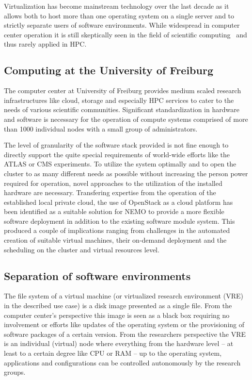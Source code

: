 Virtualization has become mainstream technology over the last decade as it allows
both to host more than one operating system on a single server and to strictly
separate users of software environments. While widespread in computer center
operation it is still skeptically seen in the field of scientific computing~\cite{VirtualisationScientificComp} and
thus rarely applied in HPC.

\subsection{Computing at the University of Freiburg}

The computer center at University of Freiburg provides
medium scaled research
infrastructures like cloud, storage and especially HPC services to cater to the
needs of various scientific communities. Significant standardization
in hardware and software is necessary for the operation of compute systems comprised of
more than 1000 individual nodes with a small group of administrators.

The level of granularity of the software stack provided is not fine enough to
directly support the quite special requirements of world-wide efforts like the
ATLAS or CMS experiments.
To utilize the system
optimally and to open the cluster to as many different needs as
possible without increasing the person power required for operation, novel approaches to the
utilization of the installed hardware are necessary.
Transfering expertise from the operation of the established local private cloud,
the use of OpenStack as a cloud platform has been identified as a
suitable solution for NEMO to provide a more flexible software
deployment in addition to the existing software module system.
This produced a couple of
implications ranging from challenges in the automated creation of suitable
virtual machines, their on-demand deployment and the scheduling on the cluster
and virtual resources level.

\subsection{Separation of software environments}

The file system of a virtual machine (or virtualized research environment (VRE) in the described use case) is a
disk image presented as a single file. From the computer center's perspective
this image is seen as a black box requiring no involvement or efforts like
updates of the operating system or the provisioning of software packages of a
certain version. From the researchers perspective the VRE is an individual
(virtual) node where everything from the hardware level -- at least to a
certain degree like CPU or RAM -- up to the operating system,
applications and configurations can be controlled autonomously by the research groups.

